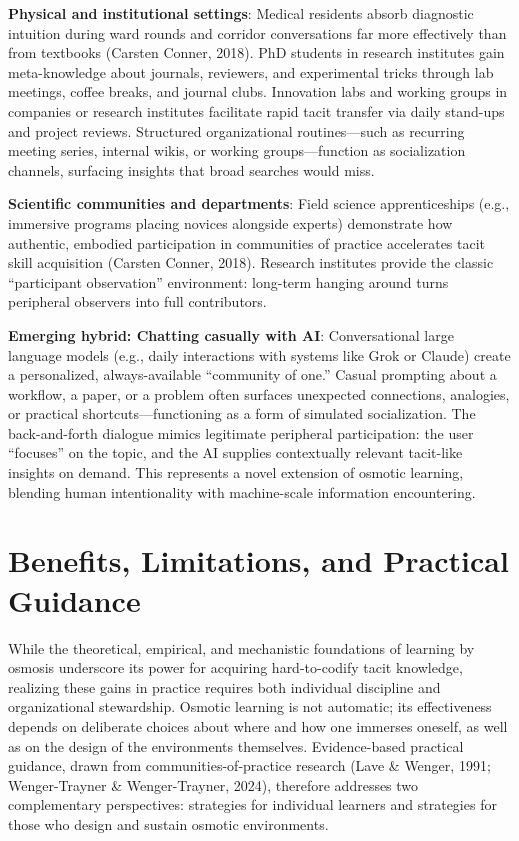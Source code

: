 \documentclass[11pt,a4paper]{article}
\begin{document}
\textbf{Physical and institutional settings}: Medical residents absorb diagnostic intuition during ward rounds and corridor conversations far more effectively than from textbooks (Carsten Conner, 2018). PhD students in research institutes gain meta-knowledge about journals, reviewers, and experimental tricks through lab meetings, coffee breaks, and journal clubs. Innovation labs and working groups in companies or research institutes facilitate rapid tacit transfer via daily stand-ups and project reviews. Structured organizational routines---such as recurring meeting series, internal wikis, or working groups---function as socialization channels, surfacing insights that broad searches would miss.

\textbf{Scientific communities and departments}: Field science apprenticeships (e.g., immersive programs placing novices alongside experts) demonstrate how authentic, embodied participation in communities of practice accelerates tacit skill acquisition (Carsten Conner, 2018). Research institutes provide the classic ``participant observation'' environment: long-term hanging around turns peripheral observers into full contributors.

\textbf{Emerging hybrid: Chatting casually with AI}: Conversational large language models (e.g., daily interactions with systems like Grok or Claude) create a personalized, always-available ``community of one.'' Casual prompting about a workflow, a paper, or a problem often surfaces unexpected connections, analogies, or practical shortcuts---functioning as a form of simulated socialization. The back-and-forth dialogue mimics legitimate peripheral participation: the user ``focuses'' on the topic, and the AI supplies contextually relevant tacit-like insights on demand. This represents a novel extension of osmotic learning, blending human intentionality with machine-scale information encountering.

\section{Benefits, Limitations, and Practical Guidance}
While the theoretical, empirical, and mechanistic foundations of learning by osmosis underscore its power for acquiring hard-to-codify tacit knowledge, realizing these gains in practice requires both individual discipline and organizational stewardship. Osmotic learning is not automatic; its effectiveness depends on deliberate choices about where and how one immerses oneself, as well as on the design of the environments themselves. Evidence-based practical guidance, drawn from communities-of-practice research (Lave \& Wenger, 1991; Wenger-Trayner \& Wenger-Trayner, 2024), therefore addresses two complementary perspectives: strategies for individual learners and strategies for those who design and sustain osmotic environments.
\end{document}
